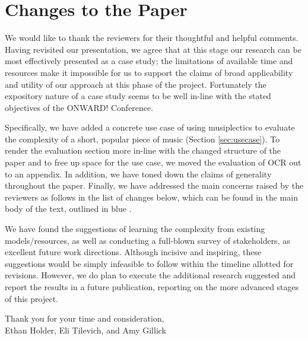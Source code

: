 \documentclass[10pt,preprint]{sigplanconf}
\begin{document}

\section*{Changes to the Paper}

We would like to thank the reviewers for their thoughtful and helpful comments. Having revisited our presentation, we agree that at this stage our research can be most effectively presented as a case study; the limitations of available time and resources make it impossible for us to support the claims of broad applicability and utility of our approach at this phase of the project. Fortunately the expository nature of a case study seems to be well in-line with the stated objectives of the ONWARD! Conference.

Specifically, we have added a concrete use case of using musiplectics to evaluate the complexity of a short, popular piece of music (Section \ref{sec:usecase}). To render the evaluation section more in-line with the changed structure of the paper and to free up space for the use case, we moved the evaluation of OCR out to an appendix. In addition, we have toned down the claims of generality throughout the paper.  Finally, we have addressed the main concerns raised by the reviewers as follows in the list of changes below, which can be found in the main body of the text, outlined in \color{blue} blue \color{black} .

\listofchanges

\vspace{0.2in}

We have found the suggestions of learning the complexity from existing models/resources, as well as conducting a full-blown survey of stakeholders, as excellent future work directions. Although incisive and inspiring, these suggestions would be simply infeasible to follow within the timeline allotted for revisions. However, we do plan to execute the additional research suggested and report the results in a future publication, reporting on the more advanced stages of this project.

Thank you for your time and consideration,\\
Ethan Holder, Eli Tilevich, and Amy Gillick




\permissiontopublish
{} 
\end{document}
